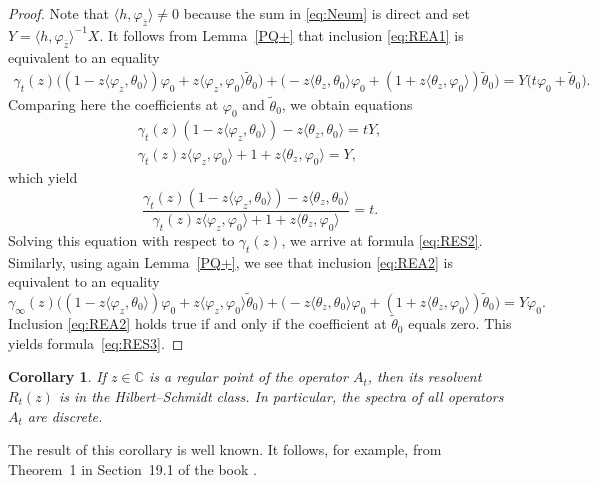 \documentclass[pdftex]{sigma}%
\numberwithin{equation}{section}
\newtheorem{Corollary}[Theorem]{Corollary}
\begin{document}
\begin{proof}
 Note that $\langle h, \varphi_{\bar{z}}\rangle\neq 0$ because the sum in \eqref{eq:Neum} is direct and set
 $Y= \langle h, \varphi_{\bar{z}}\rangle^{-1}X$.
 It follows from Lemma~\ref{PQ+} that
 inclusion \eqref{eq:REA1} is equivalent to an equality
 \begin{gather*}
 \!\gamma_{t} (z) \big( ( 1-z \langle \varphi_{z}, \theta_{0}\rangle ) \varphi_{0} +z \langle \varphi_{z}, \varphi_{0}\rangle \tilde{\theta}_{0}\big)
 + \big({-} z \langle \theta_{z}, \theta_{0} \rangle \varphi_{0} + ( 1+ z \langle \theta_{z}, \varphi_{0}\rangle ) \tilde{\theta}_{0} \big) = Y \big(t \varphi_{0} + \tilde{\theta}_{0}\big) .
 \end{gather*}
 Comparing here the coefficients at $\varphi_{0}$ and $ \tilde{\theta}_{0}$, we obtain equations
 \begin{gather*}
 \gamma_{t} (z) ( 1-z \langle \varphi_{z}, \theta_{0}\rangle )- z \langle \theta_{z}, \theta_{0}\rangle =t Y,
 \\
 \gamma_{t} (z) z \langle \varphi_{z}, \varphi_{0}\rangle + 1+ z \langle \theta_{z}, \varphi_{0}\rangle=Y,
 \end{gather*}
 which yield
 \[
 \frac{ \gamma_{t} (z) ( 1-z \langle \varphi_{z}, \theta_{0}\rangle )- z \langle \theta_{z}, \theta_{0}\rangle }
 {\gamma_{t} (z) z \langle \varphi_{z}, \varphi_{0}\rangle + 1+ z \langle \theta_{z}, \varphi_{0}\rangle } =t.
 \]
 Solving this equation with respect to $\gamma_{t} (z) $, we arrive at formula \eqref{eq:RES2}.
 Similarly, using again Lemma~\ref{PQ+}, we see that
 inclusion \eqref{eq:REA2} is equivalent to an equality
 \[
 \gamma_\infty (z) \big(( 1-z \langle \varphi_{z}, \theta_{0}\rangle ) \varphi_{0} + z \langle \varphi_{z}, \varphi_{0}\rangle \tilde{\theta}_{0} \big)
 + \big({-} z \langle \theta_{z}, \theta_{0} \rangle \varphi_{0} + ( 1+ z \langle \theta_{z}, \varphi_{0}\rangle ) \tilde{\theta}_{0} \big) = Y \varphi_{0} .
 \]
Inclusion \eqref{eq:REA2} holds true if and only if the coefficient at $\tilde{\theta}_{0} $ equals zero. This yields formula~\eqref{eq:RES3}.
\end{proof}

 \begin{Corollary}\label{RESb}
 If $z\in {\mathbb C}$ is a regular point of the operator $A_{t}$, then its resolvent~$R_{t} (z)$ is in the Hilbert--Schmidt class.
 In particular, the spectra of all operators~$A_{t}$ are discrete.
 \end{Corollary}

The result of this corollary is well known. It follows, for example, from Theorem~1 in Section~19.1 of the book \cite{Nai}.
\end{document}
